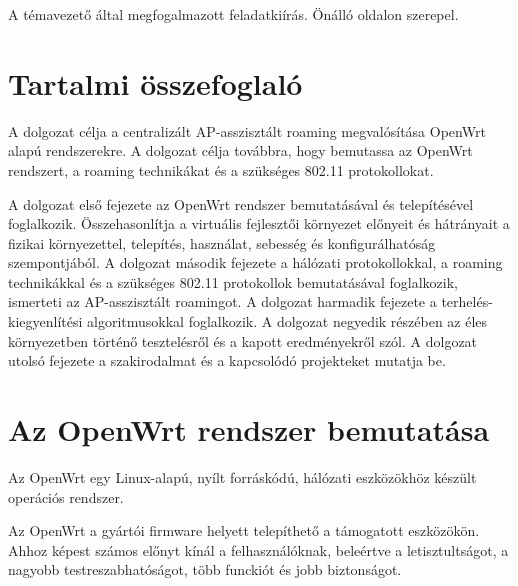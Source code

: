 \documentclass[12pt]{article}
\begin{document}
A témavezető által megfogalmazott feladatkiírás. Önálló oldalon szerepel.
\newpage

\section*{Tartalmi összefoglaló}

%

A dolgozat célja a centralizált AP-asszisztált roaming megvalósítása OpenWrt alapú rendszerekre.
A dolgozat célja továbbra, hogy bemutassa az OpenWrt rendszert, a roaming technikákat és a szükséges 802.11 protokollokat.

A dolgozat első fejezete az OpenWrt rendszer bemutatásával és telepítésével foglalkozik. Összehasonlítja a virtuális fejlesztői környezet előnyeit és hátrányait a fizikai környezettel, telepítés, használat, sebesség és konfigurálhatóság szempontjából.
A dolgozat második fejezete a hálózati protokollokkal, a roaming technikákkal és a szükséges 802.11 protokollok bemutatásával foglalkozik, ismerteti az AP-asszisztált roamingot.
A dolgozat harmadik fejezete a terhelés-kiegyenlítési algoritmusokkal foglalkozik.
A dolgozat negyedik részében az éles környezetben történő tesztelésről és a kapott eredményekről szól.
A dolgozat utolsó fejezete a szakirodalmat és a kapcsolódó projekteket mutatja be.

\newpage

\section{Az OpenWrt rendszer bemutatása}

Az OpenWrt egy Linux-alapú, nyílt forráskódú, hálózati eszközökhöz készült operációs rendszer.

Az OpenWrt a gyártói firmware helyett telepíthető a támogatott eszközökön. Ahhoz képest számos előnyt kínál a felhasználóknak, beleértve a letisztultságot, a nagyobb testreszabhatóságot, több funckiót és jobb biztonságot.
\end{document}
